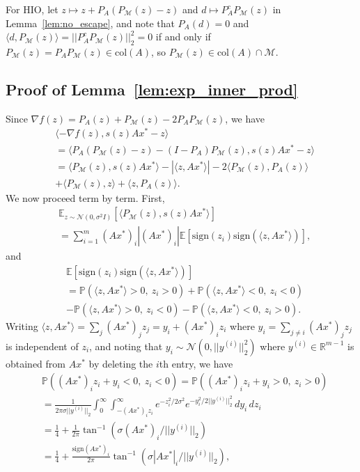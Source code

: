 \documentclass[12pt]{article}
\theoremstyle{definition}
\theoremstyle{remark}
\theoremstyle{definition}
\theoremstyle{problem}
\theoremstyle{definition}
\newcommand{\col}{\text{col}}
\newcommand{\sign}{\text{sign}}
\newcommand{\atan}{\tan^{-1}}
\newcommand{\RR}{\mathbb{R} }
\newcommand{\MM}{\mathcal{M}}
\newcommand{\PP}{\mathbb{P}}
\newcommand{\EE}{\mathbb{E}}
\begin{document}
For HIO, let $z\mapsto z + P_A(P_{\MM}(z)-z)$ and $d\mapsto P_A^cP_{\MM}(z)$ in Lemma~\ref{lem:no_escape}, and note that $P_A(d)=0$ and $\langle d,P_{\MM}(z)\rangle = ||P_A^cP_{\MM}(z)||_2^2 = 0$ if and only if $P_{\MM}(z)=P_AP_{\MM}(z)\in\col(A)$, so $P_{\MM}(z)\in\col(A)\cap\MM$.

\subsection{Proof of Lemma~\ref{lem:exp_inner_prod}}\label{sec:pf_exp_inner_prod}
Since $\nabla f(z) = P_A(z) + P_{\MM}(z) - 2P_AP_{\MM}(z)$, we have
\[\begin{aligned} &\langle -\nabla f(z), s(z)Ax^* - z\rangle \\&= \langle P_A(P_{\MM}(z)-z) - (I-P_A)P_{\MM}(z), s(z)Ax^*-z\rangle
\\ &= \langle P_{\MM}(z), s(z)Ax^*\rangle - |\langle z, Ax^*\rangle| -2\langle P_{\MM}(z), P_A(z)\rangle \\&+ \langle P_{\MM}(z), z\rangle + \langle z, P_A(z)\rangle. \end{aligned}\]
We now proceed term by term. First,
\[\begin{aligned} &\EE_{z\sim \mathcal{N}(0,\sigma^2I)}\left[\langle P_{\MM}(z), s(z)Ax^*\rangle\right] \\ &= \sum_{i=1}^m(Ax^*)_i|(Ax^*)_i|\EE[\sign(z_i)\sign(\langle z,Ax^*\rangle)], \end{aligned}\]
and
\[\begin{aligned}&\EE[\sign(z_i)\sign(\langle z,Ax^*\rangle)]\\
&= \PP(\langle z,Ax^*\rangle > 0,\ z_i>0) + \PP(\langle z,Ax^*\rangle < 0,\ z_i<0)\\
& - \PP(\langle z,Ax^*\rangle > 0,\ z_i<0) - \PP(\langle z,Ax^*\rangle < 0,\ z_i>0).\end{aligned}\]
Writing $\langle z,Ax^*\rangle = \sum_j(Ax^*)_jz_j = y_i + (Ax^*)_iz_i$ where $y_i = \sum_{j\neq i}(Ax^*)_jz_j$ is independent of $z_i$, and noting that $y_i\sim \mathcal{N}(0, ||y^{(i)}||_2^2)$ where $y^{(i)}\in\RR^{m-1}$ is obtained from $Ax^*$ by deleting the $i$th entry, we have
\[\begin{aligned} &\PP((Ax^*)_iz_i + y_i < 0,\ z_i < 0) = \PP((Ax^*)_iz_i + y_i > 0,\ z_i > 0)\\
&= \frac{1}{2\pi\sigma||y^{(i)}||_2}\int_0^{\infty}\int_{-(Ax^*)_iz_i}^{\infty}e^{-z_i^2/2\sigma^2}e^{-y_i^2/2||y^{(i)}||_2^2}\, dy_i\, dz_i\\
&= \frac{1}{4} + \frac{1}{2\pi}\atan(\sigma(Ax^*)_i/||y^{(i)}||_2)  \\&=\frac{1}{4} + \frac{\sign(Ax^*)_i}{2\pi}\atan(\sigma|Ax^*|_i/||y^{(i)}||_2),\end{aligned}\]
\end{document}
